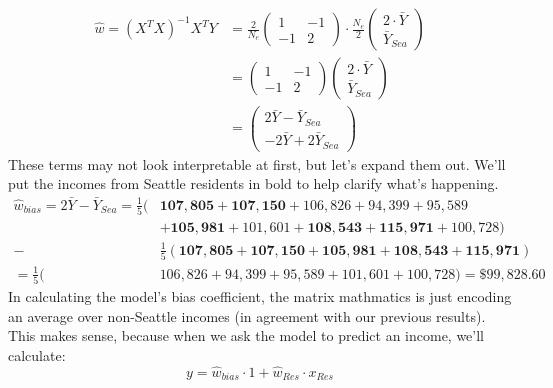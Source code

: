 \begin{align}
\hat{w} = (X^T X)^{-1} X^T Y
&= \frac{2}{N_e}
\left(\begin{array}{cc}
          1  & -1 \\
         -1  &  2 
\end{array}\right)
\cdot 
\frac{N_e}{2} 
\left(\begin{array}{c}
         2 \cdot \bar{Y} \\
          \bar{Y}_\mathit{Sea} 
\end{array}\right)
\\
&= 
\left(\begin{array}{cc}
          1  & -1 \\
         -1  &  2 
\end{array}\right)
\left(\begin{array}{c}
         2 \cdot \bar{Y} \\
          \bar{Y}_\mathit{Sea} 
\end{array}\right)
\\
&= 
\left(\begin{array}{c}
         2 \bar{Y} -   \bar{Y}_\mathit{Sea}  \\
        -2 \bar{Y} + 2 \bar{Y}_\mathit{Sea} 
\end{array}\right)
\end{align}
These terms may not look interpretable at first, but let's expand them out.
We'll put the incomes from Seattle residents in bold to help clarify what's
happening.
\begin{align}
\hat{w}_\mathit{bias} = 2 \bar{Y} -   \bar{Y}_{Sea} = \frac{1}{5}
  (&\mathbf{107,805} + \mathbf{107,150} + 106,826 + 94,399 + 95,589 \\
  &+ \mathbf{105,981} + 101,601 + \mathbf{108,543} + \mathbf{115,971} + 100,728)\\
- &\frac{1}{5}(\mathbf{107,805} + \mathbf{107,150} + \mathbf{105,981} +
\mathbf{108,543} + \mathbf{115,971})\\
= \frac{1}{5}(&106,826 + 94,399 + 95,589 + 101,601 + 100,728) 
= \$99,828.60
\end{align}
In calculating the model's bias coefficient, the matrix mathmatics is just
encoding an average over non-Seattle incomes (in agreement with our previous
results). This makes sense, because when we ask the model to predict an income,
we'll calculate:
\begin{equation}
y = \hat{w}_\mathit{bias} \cdot 1 + \hat{w}_\mathit{Res} \cdot x_\mathit{Res}
\end{equation}
